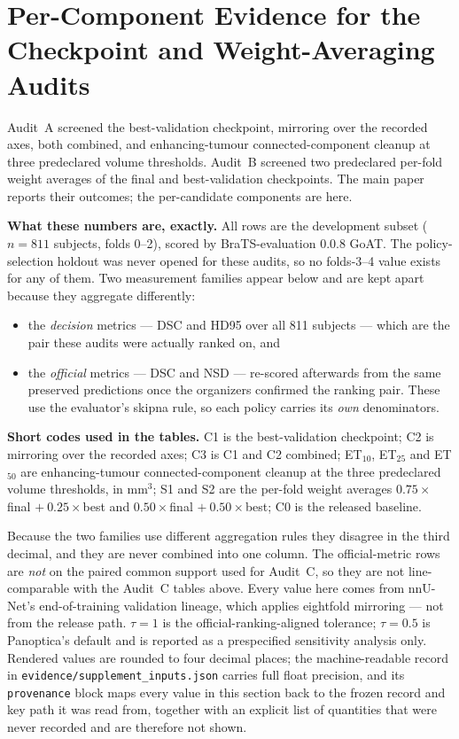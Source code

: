 \documentclass[runningheads]{llncs}
\begin{document}
\section{Per-Component Evidence for the Checkpoint and Weight-Averaging Audits}

Audit~A screened the best-validation checkpoint, mirroring over the recorded axes, both combined,
and enhancing-tumour connected-component cleanup at three predeclared volume thresholds. Audit~B
screened two predeclared per-fold weight averages of the final and best-validation checkpoints. The
main paper reports their outcomes; the per-candidate components are here.

\medskip\noindent\textbf{What these numbers are, exactly.} All rows are the development subset
($n=811$ subjects, folds 0--2), scored by BraTS-evaluation 0.0.8 GoAT. The policy-selection holdout was never
opened for these audits, so no folds-3--4 value exists for any of them. Two measurement families
appear below and are kept apart because they aggregate differently:

\begin{itemize}
\item the \emph{decision} metrics --- DSC and HD95 over all 811 subjects --- which are the pair
      these audits were actually ranked on, and
\item the \emph{official} metrics --- DSC and NSD --- re-scored afterwards from the same preserved
      predictions once the organizers confirmed the ranking pair. These use the evaluator's skipna
      rule, so each policy carries its \emph{own} denominators.
\end{itemize}

\medskip\noindent\textbf{Short codes used in the tables.} C1 is the best-validation checkpoint;
C2 is mirroring over the recorded axes; C3 is C1 and C2 combined; ET$_{10}$, ET$_{25}$ and
ET$_{50}$ are enhancing-tumour connected-component cleanup at the three predeclared volume
thresholds, in mm$^3$; S1 and S2 are the per-fold weight averages $0.75\times$final
$+\ 0.25\times$best and $0.50\times$final $+\ 0.50\times$best; C0 is the released baseline.

\noindent Because the two families use different aggregation rules they disagree in the third
decimal, and they are never combined into one column. The official-metric rows are \emph{not} on
the paired common support used for Audit~C, so they are not line-comparable with the Audit~C tables
above. Every value here comes from nnU-Net's end-of-training validation lineage, which applies
eightfold mirroring --- not from the release path. $\tau=1$ is the official-ranking-aligned
tolerance; $\tau=0.5$ is Panoptica's default and is reported as a prespecified sensitivity analysis
only. Rendered values are rounded to four decimal places; the machine-readable record in
\texttt{evidence/supplement\_inputs.json} carries full float precision, and its
\texttt{provenance} block maps every value in this section back to the frozen record and key path
it was read from, together with an explicit list of quantities that were never recorded and are
therefore not shown.
\end{document}
